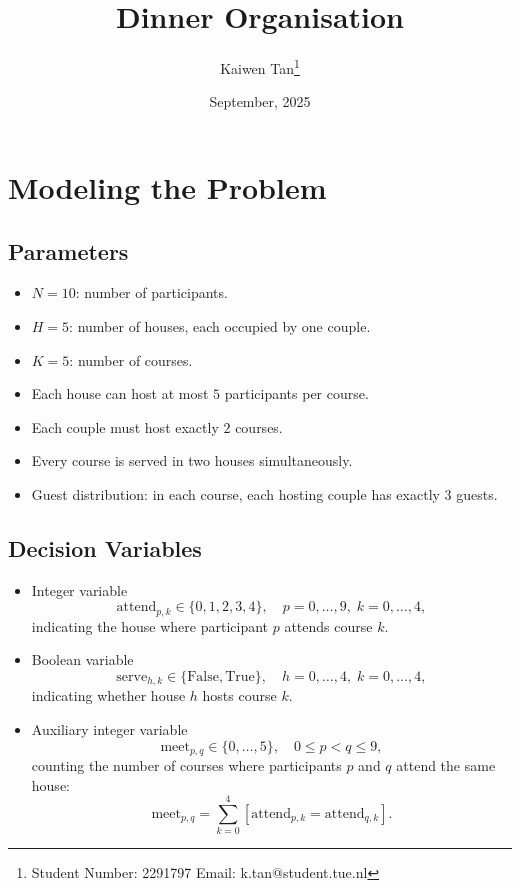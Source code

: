 \documentclass{article}
\title{Dinner Organisation}
\author{Kaiwen Tan\thanks{Student Number: 2291797 Email: k.tan@student.tue.nl}}
\date{September, 2025}
\begin{document}
\maketitle

\section{Modeling the Problem}

\subsection{Parameters}
\begin{itemize}
  \item $N = 10$: number of participants.
  \item $H = 5$: number of houses, each occupied by one couple.
  \item $K = 5$: number of courses.
  \item Each house can host at most $5$ participants per course.
  \item Each couple must host exactly $2$ courses.
  \item Every course is served in two houses simultaneously.
  \item Guest distribution: in each course, each hosting couple has exactly 3 guests.
\end{itemize}

\subsection{Decision Variables}
\begin{itemize}
    \item Integer variable 
    \[
        \text{attend}_{p,k} \in \{0,1,2,3,4\}, \quad p=0,\dots,9, \; k=0,\dots,4,
    \]
    indicating the house where participant $p$ attends course $k$.  

    \item Boolean variable 
    \[
        \text{serve}_{h,k} \in \{\text{False}, \text{True}\}, \quad h=0,\dots,4, \; k=0,\dots,4,
    \]
    indicating whether house $h$ hosts course $k$.

    \item Auxiliary integer variable 
    \[
        \text{meet}_{p,q} \in \{0,\dots,5\}, \quad 0 \le p < q \le 9,
    \]
    counting the number of courses where participants $p$ and $q$ attend the same house:
    \[
        \text{meet}_{p,q} = \sum_{k=0}^{4} [\text{attend}_{p,k} = \text{attend}_{q,k}].
    \]
\end{itemize}
\end{document}
